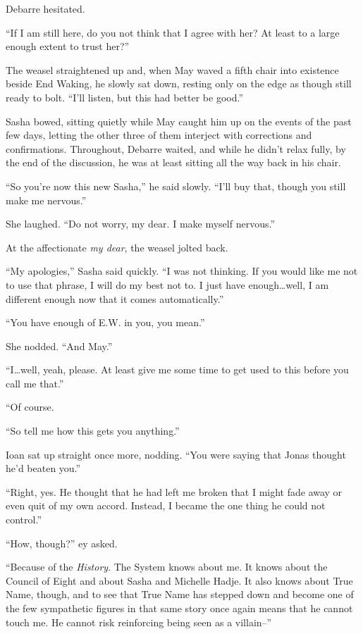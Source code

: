 Debarre hesitated.

``If I am still here, do you not think that I agree with her? At least to a large enough extent to trust her?''

The weasel straightened up and, when May waved a fifth chair into existence beside End Waking, he slowly sat down, resting only on the edge as though still ready to bolt. ``I'll listen, but this had better be good.''

Sasha bowed, sitting quietly while May caught him up on the events of the past few days, letting the other three of them interject with corrections and confirmations. Throughout, Debarre waited, and while he didn't relax fully, by the end of the discussion, he was at least sitting all the way back in his chair.

``So you're now this new Sasha,'' he said slowly. ``I'll buy that, though you still make me nervous.''

She laughed. ``Do not worry, my dear. I make myself nervous.''

At the affectionate \emph{my dear}, the weasel jolted back.

``My apologies,'' Sasha said quickly. ``I was not thinking. If you would like me not to use that phrase, I will do my best not to. I just have enough\ldots well, I am different enough now that it comes automatically.''

``You have enough of E.W. in you, you mean.''

She nodded. ``And May.''

``I\ldots well, yeah, please. At least give me some time to get used to this before you call me that.''

``Of course.

``So tell me how this gets you anything.''

Ioan sat up straight once more, nodding. ``You were saying that Jonas thought he'd beaten you.''

``Right, yes. He thought that he had left me broken that I might fade away or even quit of my own accord. Instead, I became the one thing he could not control.''

``How, though?'' ey asked.

``Because of the \emph{History}. The System knows about me. It knows about the Council of Eight and about Sasha and Michelle Hadje. It also knows about True Name, though, and to see that True Name has stepped down and become one of the few sympathetic figures in that same story once again means that he cannot touch me. He cannot risk reinforcing being seen as a villain--''

